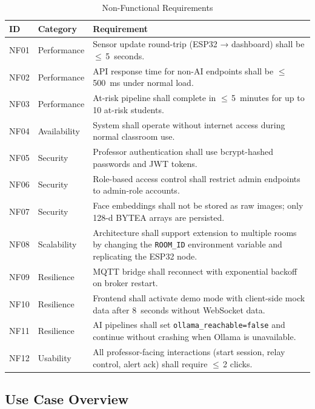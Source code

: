 \begin{table}[H]
\centering
\caption{Non-Functional Requirements}
\label{tab:nonfunc_req}
\begin{tabular}{@{}p{0.7cm}p{2.0cm}p{4.8cm}@{}}
\toprule
\textbf{ID} & \textbf{Category} & \textbf{Requirement} \\
\midrule
NF01 & Performance  & Sensor update round-trip (ESP32 → dashboard) shall be $\leq$\,5~seconds. \\
NF02 & Performance  & API response time for non-AI endpoints shall be $\leq$\,500~ms under normal load. \\
NF03 & Performance  & At-risk pipeline shall complete in $\leq$\,5~minutes for up to 10 at-risk students. \\
\midrule
NF04 & Availability & System shall operate without internet access during normal classroom use. \\
\midrule
NF05 & Security     & Professor authentication shall use bcrypt-hashed passwords and JWT tokens. \\
NF06 & Security     & Role-based access control shall restrict admin endpoints to admin-role accounts. \\
NF07 & Security     & Face embeddings shall not be stored as raw images; only 128-d BYTEA arrays are persisted. \\
\midrule
NF08 & Scalability  & Architecture shall support extension to multiple rooms by changing the \texttt{ROOM\_ID} environment variable and replicating the ESP32 node. \\
\midrule
NF09 & Resilience   & MQTT bridge shall reconnect with exponential backoff on broker restart. \\
NF10 & Resilience   & Frontend shall activate demo mode with client-side mock data after 8~seconds without WebSocket data. \\
NF11 & Resilience   & AI pipelines shall set \texttt{ollama\_reachable=false} and continue without crashing when Ollama is unavailable. \\
\midrule
NF12 & Usability    & All professor-facing interactions (start session, relay control, alert ack) shall require $\leq$\,2 clicks. \\
\bottomrule
\end{tabular}
\end{table}

\subsection{Use Case Overview}
\label{subsec:usecases}

